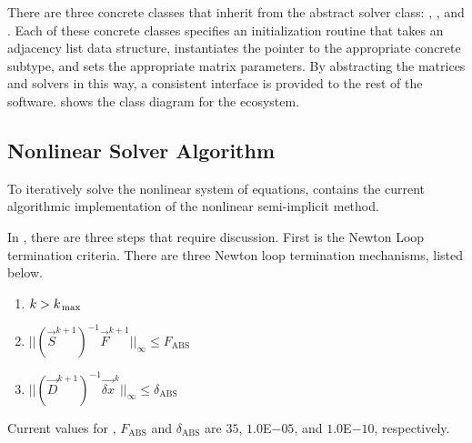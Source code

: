 There are three concrete classes that inherit from the abstract solver class: , , and .
Each of these concrete classes specifies an initialization routine that takes an adjacency list data structure, instantiates the  pointer to the appropriate concrete subtype, and sets the appropriate matrix parameters.
By abstracting the matrices and solvers in this way, a consistent interface is provided to the rest of the software.
 shows the class diagram for the  ecosystem.

\subsection{Nonlinear Solver Algorithm}
\label{subsect:nlnCobraAlgo}


To iteratively solve the nonlinear system of equations, 
 contains the current algorithmic implementation of the nonlinear semi-implicit method.

In , there are three steps that require discussion.
First is the Newton Loop termination criteria.
There are three Newton loop termination mechanisms, listed below.

\begin{enumerate}
\item{$k > \kmax{}$}
\item{$||(\vec{S}^{k+1})^{-1}\vec{F}^{k+1}||_{\infty} \leq F_{\text{ABS}}$}
\item{$||(\vec{D}^{k+1})^{-1}\vec{\delta x}^{k}||_{\infty} \leq \delta_{\text{ABS}}$}
\end{enumerate}

Current values for \kmax{}, $F_{\text{ABS}}$ and $\delta_{\text{ABS}}$ are $35$, $1.0$E$-05$, and $1.0$E$-10$, respectively.

